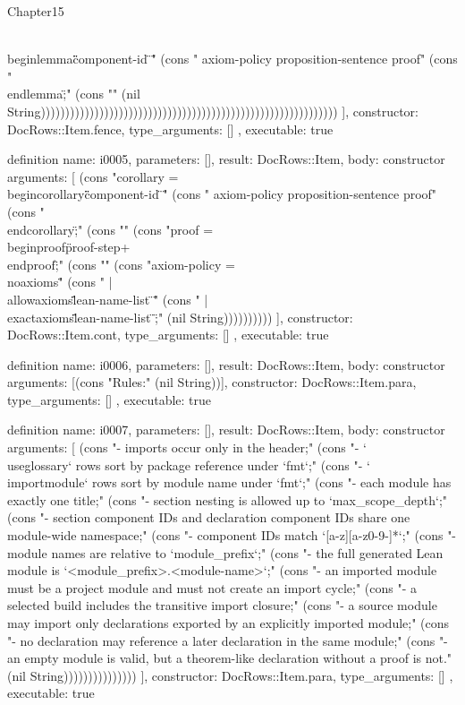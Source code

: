 \begin{lexlean}{Chapter15}
\begin{semanticmodule}
{{\"\\begin{lemma}\" \"{\" component-id \"}\"" (cons "                  axiom-policy proposition-sentence proof" (cons "                  \"\\end{lemma}\" ;" (cons "" (nil String)))))))))))))))))))))))))))))))))))))))))))))))))))))))))))))
    ],
    constructor: DocRows::Item.fence,
    type_arguments: []
  },
  executable: true
}

definition{
  name: i0005,
  parameters: [],
  result: DocRows::Item,
  body: constructor{
    arguments: [
      (cons "corollary       = \"\\begin{corollary}\" \"{\" component-id \"}\"" (cons "                  axiom-policy proposition-sentence proof" (cons "                  \"\\end{corollary}\" ;" (cons "" (cons "proof           = \"\\begin{proof}\" proof-step+ \"\\end{proof}\" ;" (cons "" (cons "axiom-policy    = \"\\noaxioms\"" (cons "                | \"\\allowaxioms\" \"{\" lean-name-list \"}\"" (cons "                | \"\\exactaxioms\" \"{\" lean-name-list \"}\" ;" (nil String))))))))))
    ],
    constructor: DocRows::Item.cont,
    type_arguments: []
  },
  executable: true
}

definition{
  name: i0006,
  parameters: [],
  result: DocRows::Item,
  body: constructor{
    arguments: [(cons "Rules:" (nil String))],
    constructor: DocRows::Item.para,
    type_arguments: []
  },
  executable: true
}

definition{
  name: i0007,
  parameters: [],
  result: DocRows::Item,
  body: constructor{
    arguments: [
      (cons "- imports occur only in the header;" (cons "- `\\useglossary` rows sort by package reference under `fmt`;" (cons "- `\\importmodule` rows sort by module name under `fmt`;" (cons "- each module has exactly one title;" (cons "- section nesting is allowed up to `max_scope_depth`;" (cons "- section component IDs and declaration component IDs share one module-wide namespace;" (cons "- component IDs match `[a-z][a-z0-9-]*`;" (cons "- module names are relative to `module_prefix`;" (cons "- the full generated Lean module is `<module_prefix>.<module-name>`;" (cons "- an imported module must be a project module and must not create an import cycle;" (cons "- a selected build includes the transitive import closure;" (cons "- a source module may import only declarations exported by an explicitly imported module;" (cons "- no declaration may reference a later declaration in the same module;" (cons "- an empty module is valid, but a theorem-like declaration without a proof is not." (nil String)))))))))))))))
    ],
    constructor: DocRows::Item.para,
    type_arguments: []
  },
  executable: true
}


\end{semanticmodule}
\end{lexlean}
